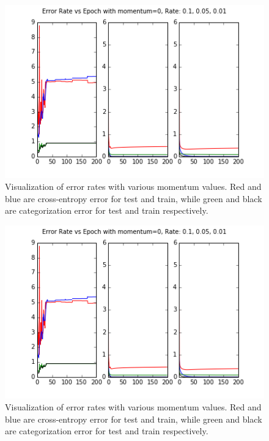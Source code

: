 \documentclass{article}
\begin{document}
\begin{figure}[h]
  \centering
  \includegraphics[scale=0.6]{../momentum0_rate10501.png} 
  \caption{Visualization of error rates with various momentum values. Red and blue are cross-entropy error for test and train, while green and black are categorization error for test and train respectively. }
  \label{fig:momentumsrate1}
\end{figure}



\begin{figure}[h]
  \centering
  \includegraphics[scale=0.6]{../momentum0_rate10501.png} 
  \caption{Visualization of error rates with various momentum values. Red and blue are cross-entropy error for test and train, while green and black are categorization error for test and train respectively. }
  \label{fig:momentumsrate2}
\end{figure}
\end{document}
